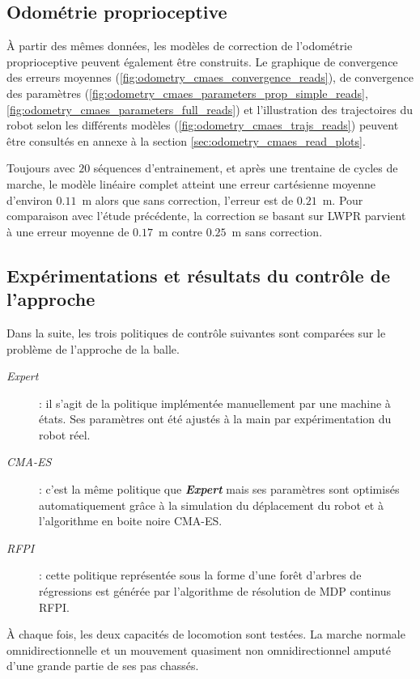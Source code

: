 \subsection{Odométrie proprioceptive}

À partir des mêmes données, les modèles de correction de l'odométrie proprioceptive 
peuvent également être construits.
Le graphique de convergence des erreurs moyennes (\ref{fig:odometry_cmaes_convergence_reads}),
de convergence des paramètres (\ref{fig:odometry_cmaes_parameters_prop_simple_reads}, 
\ref{fig:odometry_cmaes_parameters_full_reads}) et l'illustration des trajectoires 
du robot selon les différents modèles (\ref{fig:odometry_cmaes_trajs_reads})
peuvent être consultés en annexe à la section \ref{sec:odometry_cmaes_read_plots}.

Toujours avec $20$ séquences d'entrainement, et après une trentaine de cycles de marche, 
le modèle linéaire complet atteint une erreur cartésienne moyenne d'environ $0.11$~m 
alors que sans correction, l'erreur est de $0.21$~m.
Pour comparaison avec l'étude précédente, la correction se basant sur LWPR parvient
à une erreur moyenne de $0.17$~m contre $0.25$~m sans correction.

\subsection{Expérimentations et résultats du contrôle de l'approche}

Dans la suite, les trois politiques de contrôle suivantes sont
comparées sur le problème de l'approche de la balle.
\begin{description}
    \item[\textit{Expert}] : il s'agit de la politique implémentée manuellement 
        par une machine à états. Ses paramètres ont été ajustés à la main par 
        expérimentation du robot réel.
    \item[\textit{CMA-ES}] : c'est la même politique que \textit{\textbf{Expert}} mais ses paramètres 
        sont optimisés automatiquement grâce à la simulation du déplacement du robot 
        et à l'algorithme en boite noire CMA-ES.
    \item[\textit{RFPI}] : cette politique représentée sous la forme d'une forêt d'arbres 
        de régressions est générée par l'algorithme de résolution de MDP continus RFPI.
\end{description}
À chaque fois, les deux capacités de locomotion sont testées. 
La marche normale omnidirectionnelle et un mouvement quasiment non omnidirectionnel
amputé d'une grande partie de ses pas chassés.\\

